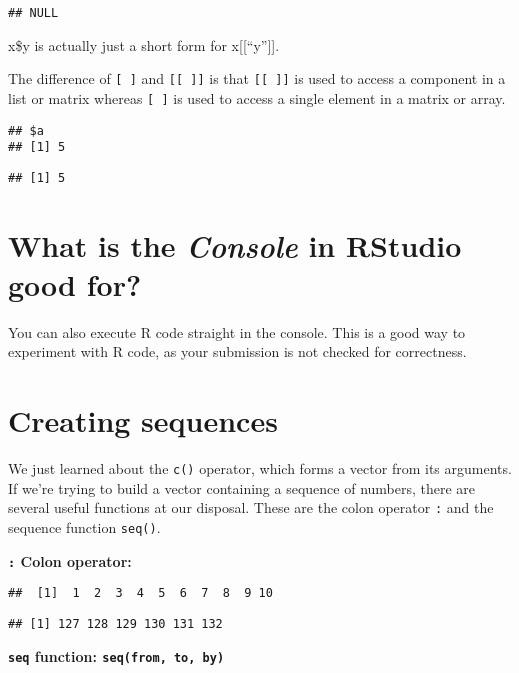 \documentclass[
]{article}
\begin{document}
\begin{verbatim}
## NULL
\end{verbatim}

x\$y is actually just a short form for x{[}{[}``y''{]}{]}.

The difference of \texttt{{[}\ {]}} and \texttt{{[}{[}\ {]}{]}} is that
\texttt{{[}{[}\ {]}{]}} is used to access a component in a list or
matrix whereas \texttt{{[}\ {]}} is used to access a single element in a
matrix or array.

\begin{verbatim}
## $a
## [1] 5
\end{verbatim}

\begin{verbatim}
## [1] 5
\end{verbatim}

\hypertarget{what-is-the-console-in-rstudio-good-for}{%
\section{\texorpdfstring{What is the \emph{Console} in RStudio good
for?}{What is the Console in RStudio good for?}}\label{what-is-the-console-in-rstudio-good-for}}

You can also execute R code straight in the console. This is a good way
to experiment with R code, as your submission is not checked for
correctness.

\hypertarget{creating-sequences}{%
\section{Creating sequences}\label{creating-sequences}}

We just learned about the \texttt{c()} operator, which forms a vector
from its arguments. If we're trying to build a vector containing a
sequence of numbers, there are several useful functions at our disposal.
These are the colon operator \texttt{:} and the sequence function
\texttt{seq()}.

\textbf{\texttt{:} Colon operator:}

\begin{verbatim}
##  [1]  1  2  3  4  5  6  7  8  9 10
\end{verbatim}

\begin{verbatim}
## [1] 127 128 129 130 131 132
\end{verbatim}

\textbf{\texttt{seq} function: \texttt{seq(from,\ to,\ by)}}
\end{document}
